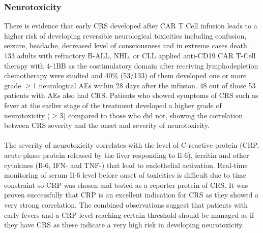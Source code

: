\documentclass[12pt,oneside]{report}
\begin{document}
\subsubsection{Neurotoxicity} 
There is evidence that early CRS developed after CAR T Cell infusion leads to a higher risk of developing reversible neurological toxicities including confusion, seizure, headache, decreased level of consciousness and in extreme cases death\citep{ALL, cyto-10, cyto-11}. 133 adults with refractory B-ALL, NHL, or CLL applied anti-CD19 CAR T-Cell therapy with 4-1BB as the costimulatory domain after receiving lymphodepletion chemotherapy were studied and 40\% (53/133) of them developed one or more grade $\geq$1 neurological AEs\citep{cyto-11} within 28 days after the infusion. 48 out of those 53 patients with AEs also had CRS. Patients who showed symptoms of CRS such as fever at the earlier stage of the treatment developed a higher grade of neurotoxicity ($\geq$3) compared to those who did not, showing the correlation between CRS severity and the onset and severity of neurotoxicity. 
\\\\The severity of neurotoxicity correlates with the level of C-reactive protein (CRP, acute-phase protein released by the liver responding to Il-6), ferritin and other cytokines (Il-6, IFN-\textgamma{} and TNF-\textalpha) that lead to endothelial activation\citep{ALL, cyto-11}. Real-time monitoring of serum Il-6 level before onset of toxicities is difficult due to time constraint so CRP was chosen and tested as a reporter protein of CRS\citep{ALL}. It was proven successfully that CRP is an excellent indication for CRS as they showed a very strong correlation\citep{ALL}. The combined observations suggest that patients with early fevers and a CRP level reaching certain threshold should be managed as if they have CRS as these indicate a very high risk in developing neurotoxicity. 
\end{document}
